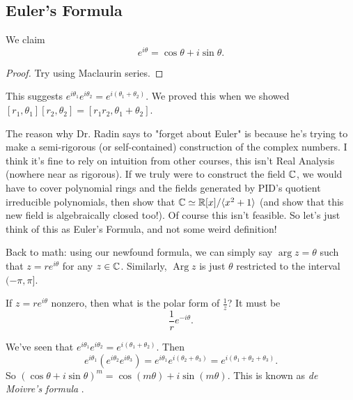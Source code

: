 \subsection{Euler's Formula}
\begin{theorem}
    We claim \[
    e^{i\theta}=\cos\theta+i\sin\theta.
    \]
\end{theorem}
\begin{proof}
    Try using Maclaurin series.
\end{proof}
This suggests $e^{i\theta_1}e^{i\theta_2}=e^{i(\theta_1+\theta_2)}$. We proved this when we showed $[r_1,\theta_1][r_2,\theta_2]=[r_1r_2,\theta_1+\theta_2]$.

The reason why Dr. Radin says to "forget about Euler" is because he's trying to make a semi-rigorous (or self-contained) construction of the complex numbers. I think it's fine to rely on intuition from other courses, this isn't Real Analysis (nowhere near as rigorous). If we truly were to construct the field $\mathbb{C}$, we would have to cover polynomial rings and the fields generated by PID's quotient irreducible polynomials, then show that $\mathbb{C} \simeq \mathbb{R}[x]/\langle x^2+1 \rangle $ (and show that this new field is algebraically closed too!). Of course this isn't feasible. So let's just think of this as Euler's Formula, and not some weird definition!

Back to math: using our newfound formula, we can simply say $\operatorname{arg} z = \theta$ such that $z=re^{i\theta}$ for any $z\in \mathbb{C}$. Similarly, $\operatorname{Arg}z$ is just $\theta$ restricted to the interval  $(-\pi,\pi]$.
\begin{example}
    If $z=re^{i\theta}$ nonzero, then what is the polar form of $\frac{1}{z}$? It must be \[
    \frac{1}{r}e^{-i\theta}.
    \]
\end{example}
\begin{example}
 We've seen that $e^{i\theta_1}e^{i\theta_2}=e^{i(\theta_1+\theta_2)}$. Then \[
    e^{i\theta_1}\left( e^{i\theta_2}e^{i\theta_3} \right) =e^{i\theta_1}e^{i(\theta_2+\theta_3)}= e^{i(\theta_1+\theta_2+\theta_3)}.
\]
So $\left( \cos\theta+i\sin\theta \right)^{m}=\cos(m\theta)+i\sin(m\theta)$. This is known as \emph{de Moivre's formula} .   
\end{example}
